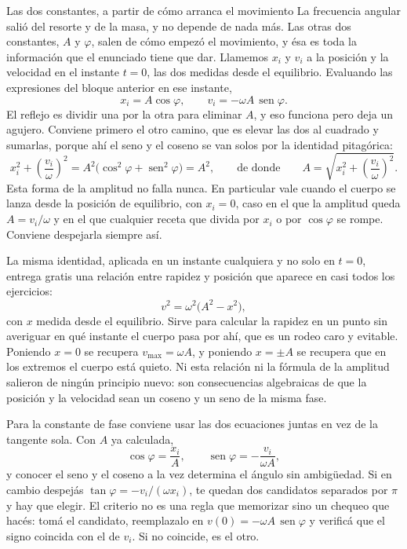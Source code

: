 \documentclass[11pt,openany]{book}
\newcommand{\sen}{\operatorname{sen}}
\begin{document}
\begin{bloque}{Las dos constantes, a partir de cómo arranca el movimiento}
La frecuencia angular salió del resorte y de la masa, y no depende de nada más. Las otras dos constantes, $A$ y $\varphi$, salen de cómo empezó el movimiento, y ésa es toda la información que el enunciado tiene que dar. Llamemos $x_i$ y $v_i$ a la posición y la velocidad en el instante $t=0$, las dos medidas desde el equilibrio. Evaluando las expresiones del bloque anterior en ese instante,
\[
x_i = A\cos\varphi,
\qquad
v_i = -\omega A\,\sen\varphi .
\]
El reflejo es dividir una por la otra para eliminar $A$, y eso funciona pero deja un agujero. Conviene primero el otro camino, que es elevar las dos al cuadrado y sumarlas, porque ahí el seno y el coseno se van solos por la identidad pitagórica:
\[
x_i^{2} + \left(\frac{v_i}{\omega}\right)^{2} = A^{2}\big(\cos^{2}\varphi + \sen^{2}\varphi\big) = A^{2},
\qquad\text{de donde}\qquad
A = \sqrt{x_i^{2} + \left(\frac{v_i}{\omega}\right)^{2}} .
\]
Esta forma de la amplitud no falla nunca. En particular vale cuando el cuerpo se lanza desde la posición de equilibrio, con $x_i = 0$, caso en el que la amplitud queda $A = v_i/\omega$ y en el que cualquier receta que divida por $x_i$ o por $\cos\varphi$ se rompe. Conviene despejarla siempre así.

La misma identidad, aplicada en un instante cualquiera y no solo en $t=0$, entrega gratis una relación entre rapidez y posición que aparece en casi todos los ejercicios:
\[
v^{2} = \omega^{2}\big(A^{2} - x^{2}\big) ,
\]
con $x$ medida desde el equilibrio. Sirve para calcular la rapidez en un punto sin averiguar en qué instante el cuerpo pasa por ahí, que es un rodeo caro y evitable. Poniendo $x = 0$ se recupera $v_{\max} = \omega A$, y poniendo $x = \pm A$ se recupera que en los extremos el cuerpo está quieto. Ni esta relación ni la fórmula de la amplitud salieron de ningún principio nuevo: son consecuencias algebraicas de que la posición y la velocidad sean un coseno y un seno de la misma fase.

Para la constante de fase conviene usar las dos ecuaciones juntas en vez de la tangente sola. Con $A$ ya calculada,
\[
\cos\varphi = \frac{x_i}{A},
\qquad
\sen\varphi = -\frac{v_i}{\omega A} ,
\]
y conocer el seno y el coseno a la vez determina el ángulo sin ambigüedad. Si en cambio despejás $\tan\varphi = -v_i/(\omega x_i)$, te quedan dos candidatos separados por $\pi$ y hay que elegir. El criterio no es una regla que memorizar sino un chequeo que hacés: tomá el candidato, reemplazalo en $v(0) = -\omega A\,\sen\varphi$ y verificá que el signo coincida con el de $v_i$. Si no coincide, es el otro.


\end{bloque}
\end{document}
